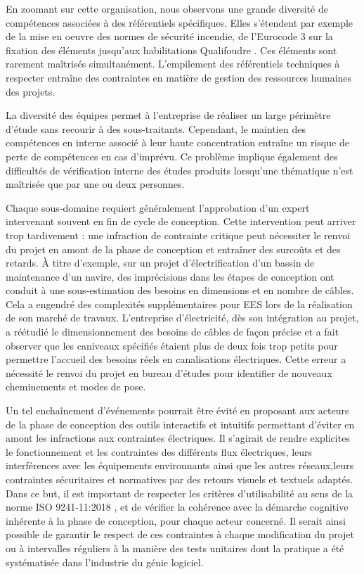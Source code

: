 \documentclass[a4paper,12pt]{article}
\begin{document}
En zoomant sur cette organisation, nous observons une grande diversité de compétences associées à des référentiels spécifiques. Elles s’étendent par exemple de la mise en oeuvre des normes de sécurité incendie, de l’Eurocode 3 \autocite{icabEurocodesCodesConstructiona} sur la fixation des éléments jusqu’aux habilitations Qualifoudre \autocite{charpentierReferentielPourCertificationa}. Ces éléments sont rarement maîtrisés simultanément. L’empilement des référentiels techniques à respecter entraîne des contraintes en matière de gestion des ressources humaines des projets.

La diversité des équipes permet à l’entreprise de réaliser un large périmètre d’étude sans recourir à des sous-traitants. Cependant, le maintien des compétences en interne associé à leur haute concentration entraîne un risque de perte de compétences en cas d’imprévu. Ce problème implique également des difficultés de vérification interne des études produits lorsqu’une thématique n’est maîtrisée que par une ou deux personnes.

Chaque sous-domaine requiert généralement l’approbation d'un expert intervenant souvent en fin de cycle de conception. Cette intervention peut arriver trop tardivement : une infraction de contrainte critique peut nécessiter le renvoi du projet en amont de la phase de conception et entraîner des surcoûts et des retards. À titre d’exemple, sur un projet d’électrification d’un bassin de maintenance d’un navire, des imprécisions dans les étapes de conception ont conduit à une sous-estimation des besoins en dimensions et en nombre de câbles. Cela a engendré des complexités supplémentaires pour EES lors de la réalisation de son marché de travaux. L’entreprise d’électricité, dès son intégration au projet, a réétudié le dimensionnement des besoins de câbles de façon précise et a fait observer que les caniveaux spécifiés étaient plus de deux fois trop petits pour permettre l’accueil des besoins réels en canalisations électriques. Cette erreur a nécessité le renvoi du projet en bureau d’études pour identifier de nouveaux cheminements et modes de pose.

Un tel enchaînement d'événements pourrait être évité en proposant aux acteurs de la phase de conception des outils interactifs et intuitifs permettant d’éviter en amont les infractions aux contraintes électriques. Il s'agirait de rendre explicites le fonctionnement et les contraintes des différents flux électriques, leurs interférences avec les équipements environnants ainsi que les autres réseaux,leurs contraintes sécuritaires et normatives par des retours visuels et textuels adaptés. Dans ce but, il est important de respecter les critères d'utilisabilité au sens de la norme ISO 9241-11:2018 \autocite{ErgonomieLinteractionHommesysteme2018}, et de vérifier la cohérence avec la démarche cognitive inhérente à la phase de conception, pour chaque acteur concerné. Il serait ainsi possible de garantir le respect de ces contraintes à chaque modification du projet ou à intervalles réguliers à la manière des tests unitaires dont la pratique a été systématisée dans l'industrie du génie logiciel.
\end{document}

